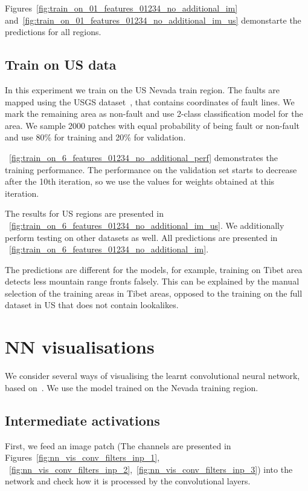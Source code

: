 \documentclass[11pt,a4paper]{article}
\begin{document}
Figures~\ref{fig:train_on_01_features_01234_no_additional_im} and~\ref{fig:train_on_01_features_01234_no_additional_im_us}
demonstarte the predictions for all regions.

\subsection{Train on US data}
In this experiment we train on the US Nevada train region. The faults are mapped using the
USGS dataset~\cite{usgs_data}, that contains coordinates of fault lines. We mark the remaining area as non-fault and use
2-class classification model for the area. We sample 2000 patches with equal probability of being fault or non-fault and
use 80\% for training and 20\% for validation.

\figurename~\ref{fig:train_on_6_features_01234_no_additional_perf} demonstrates the
training performance. The performance on the validation set starts to decrease after the 10th iteration, so we use the
values for weights obtained at this iteration.

The results for US regions are presented in \figurename~\ref{fig:train_on_6_features_01234_no_additional_im_us}. We
additionally perform testing on other datasets as well. All predictions are presented in
\figurename~\ref{fig:train_on_6_features_01234_no_additional_im}.

The predictions are different for the models, for example, training on Tibet area detects less mountain range fronts falsely.
This can be explained by the manual selection of the training areas in Tibet areas, opposed to the training on the full
dataset in US that does not contain lookalikes.

\section{NN visualisations}
We consider several ways of visualising the learnt convolutional neural network, based on~\cite{francois2017deep}.
We use the model trained on the Nevada training region.

\subsection{Intermediate activations}
First, we feed an image patch (The channels are presented in Figures~\ref{fig:nn_vis_conv_filters_inp_1},
~\ref{fig:nn_vis_conv_filters_inp_2},~\ref{fig:nn_vis_conv_filters_inp_3}) into the network and check how it is processed
by the convolutional layers.
\end{document}
